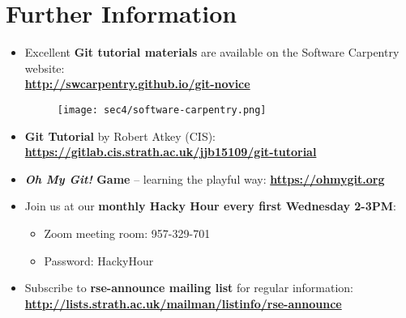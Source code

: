 \section{Further Information}\hypertarget{sec3}{}

\begin{frame}[fragile]
\emptyframetitle

\begin{itemize}
\setlength{\itemsep}{5pt}
  \item  Excellent \textbf{Git tutorial materials} are available on the Software Carpentry website:\\
  \textbf{\small\url{http://swcarpentry.github.io/git-novice}}\\
  \begin{figure}[h]
  \begin{center}
    \texttt{[image: sec4/software-carpentry.png]}
  \end{center}
  \end{figure}

  \item \textbf{Git Tutorial} by Robert Atkey (CIS):
  \textbf{\small\url{https://gitlab.cis.strath.ac.uk/jjb15109/git-tutorial}}

  \item \textbf{\textit{Oh My Git!} Game} -- learning the playful way:
  \textbf{\small\url{https://ohmygit.org}}

  \item Join us at our \textbf{monthly Hacky Hour every first Wednesday 2-3PM}:
  \begin{itemize}
    \item[] \normalsize Zoom meeting room: 957-329-701
    \item[] \normalsize Password: HackyHour
  \end{itemize}

  \item Subscribe to \textbf{rse-announce mailing list} for regular information:\\
  \textbf{\small\url{http://lists.strath.ac.uk/mailman/listinfo/rse-announce}}
\end{itemize}

\end{frame}


